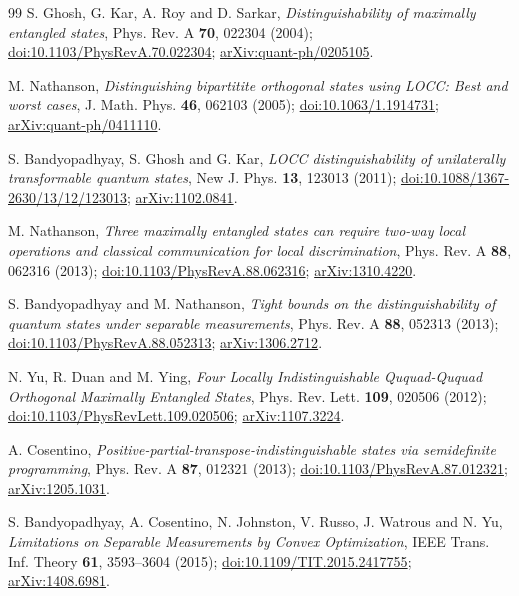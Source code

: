 \documentclass[11pt,a4paper]{article}
\theoremstyle{definition}
\theoremstyle{plain}
\begin{document}
\begin{thebibliography}{99}
S. Ghosh, G. Kar, A. Roy and D. Sarkar,
\emph{Distinguishability of maximally entangled states},
Phys. Rev. A \textbf{70}, 022304 (2004);
\href{https://doi.org/10.1103/PhysRevA.70.022304}{doi:10.1103/PhysRevA.70.022304};
\href{https://arxiv.org/abs/quant-ph/0205105}{arXiv:quant-ph/0205105}.

M. Nathanson,
\emph{Distinguishing bipartitite orthogonal states using LOCC: Best and worst cases},
J. Math. Phys. \textbf{46}, 062103 (2005);
\href{https://doi.org/10.1063/1.1914731}{doi:10.1063/1.1914731};
\href{https://arxiv.org/abs/quant-ph/0411110}{arXiv:quant-ph/0411110}.

S. Bandyopadhyay, S. Ghosh and G. Kar,
\emph{LOCC distinguishability of unilaterally transformable quantum states},
New J. Phys. \textbf{13}, 123013 (2011);
\href{https://doi.org/10.1088/1367-2630/13/12/123013}{doi:10.1088/1367-2630/13/12/123013};
\href{https://arxiv.org/abs/1102.0841}{arXiv:1102.0841}.

M. Nathanson,
\emph{Three maximally entangled states can require two-way local operations
and classical communication for local discrimination},
Phys. Rev. A \textbf{88}, 062316 (2013);
\href{https://doi.org/10.1103/PhysRevA.88.062316}{doi:10.1103/PhysRevA.88.062316};
\href{https://arxiv.org/abs/1310.4220}{arXiv:1310.4220}.

S. Bandyopadhyay and M. Nathanson,
\emph{Tight bounds on the distinguishability of quantum states under separable measurements},
Phys. Rev. A \textbf{88}, 052313 (2013);
\href{https://doi.org/10.1103/PhysRevA.88.052313}{doi:10.1103/PhysRevA.88.052313};
\href{https://arxiv.org/abs/1306.2712}{arXiv:1306.2712}.

N. Yu, R. Duan and M. Ying,
\emph{Four Locally Indistinguishable Ququad-Ququad Orthogonal Maximally Entangled States},
Phys. Rev. Lett. \textbf{109}, 020506 (2012);
\href{https://doi.org/10.1103/PhysRevLett.109.020506}{doi:10.1103/PhysRevLett.109.020506};
\href{https://arxiv.org/abs/1107.3224}{arXiv:1107.3224}.

A. Cosentino,
\emph{Positive-partial-transpose-indistinguishable states via semidefinite programming},
Phys. Rev. A \textbf{87}, 012321 (2013);
\href{https://doi.org/10.1103/PhysRevA.87.012321}{doi:10.1103/PhysRevA.87.012321};
\href{https://arxiv.org/abs/1205.1031}{arXiv:1205.1031}.

S. Bandyopadhyay, A. Cosentino, N. Johnston, V. Russo, J. Watrous and N. Yu,
\emph{Limitations on Separable Measurements by Convex Optimization},
IEEE Trans. Inf. Theory \textbf{61}, 3593--3604 (2015);
\href{https://doi.org/10.1109/TIT.2015.2417755}{doi:10.1109/TIT.2015.2417755};
\href{https://arxiv.org/abs/1408.6981}{arXiv:1408.6981}.


\end{thebibliography}
\end{document}
